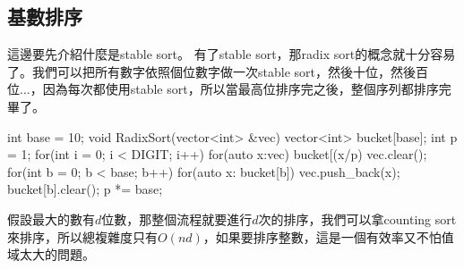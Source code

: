 \documentclass[main.tex]{subfiles}
\begin{document}
\subsection{基數排序}
這邊要先介紹什麼是stable sort。
有了stable sort，那radix sort的概念就十分容易了。我們可以把所有數字依照個位數字做一次stable sort，然後十位，然後百位...，因為每次都使用stable sort，所以當最高位排序完之後，整個序列都排序完畢了。
\begin{C++}
int base = 10;
void RadixSort(vector<int> &vec){
    vector<int> bucket[base];
    int p = 1;
    for(int i = 0; i < DIGIT; i++){
        for(auto x:vec)
            bucket[(x/p)%
        vec.clear();
        for(int b = 0; b < base; b++){
            for(auto x: bucket[b])
                vec.push_back(x);
            bucket[b].clear();
        }
        p *= base;
    }
}
\end{C++}
假設最大的數有$d$位數，那整個流程就要進行$d$次的排序，我們可以拿counting sort來排序，所以總複雜度只有$O(nd)$，如果要排序整數，這是一個有效率又不怕值域太大的問題。
\end{document}
